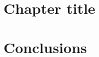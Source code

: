 \documentclass{Configuration_Files/PoliMi3i_thesis}
\begin{document}
%
%
%    
%

\mainmatter %

\chapter{Chapter title}
\label{chapter:chapter1}


\chapter{Conclusions}
\label{chapter:Conclusions}





\end{document}
